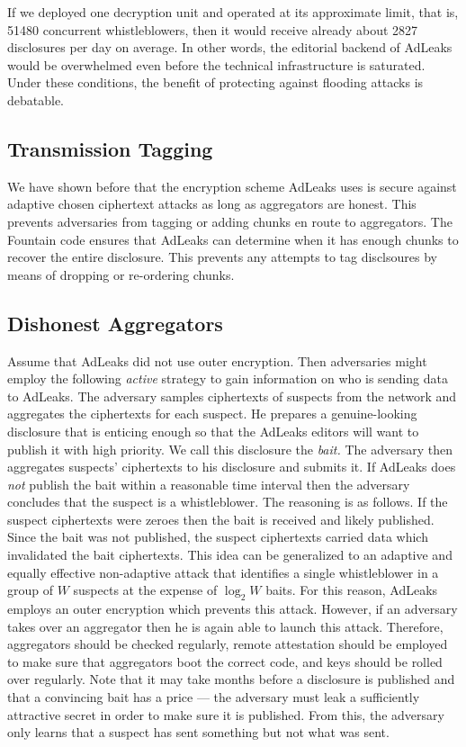 \documentclass[twocolumn,10pt]{article}
\newcommand{\Kmaxwb}{51480}
\newcommand{\Kmaxfiles}{2827}
\begin{document}
If we deployed one decryption unit and operated at its approximate limit,
that is, \Kmaxwb{} concurrent whistleblowers, then it would receive already
about \Kmaxfiles{} disclosures per day on average.  In other words, the
editorial backend of AdLeaks would be overwhelmed even before the technical
infrastructure is saturated.  Under these conditions, the benefit of
protecting against flooding attacks is debatable.


\subsection{Transmission Tagging}
\label{sec:tagging}

We have shown before that the encryption scheme AdLeaks uses is secure
against adaptive chosen ciphertext attacks as long as aggregators are
honest.  This prevents adversaries from tagging or adding chunks en route to
aggregators.  The Fountain code ensures that AdLeaks can determine when it
has enough chunks to recover the entire disclosure.  This prevents any
attempts to tag disclsoures by means of dropping or re-ordering chunks.


\subsection{Dishonest Aggregators}
\label{sec:bait}

Assume that AdLeaks did not use outer encryption.  Then adversaries might
employ the following \emph{active} strategy to gain information on who is
sending data to AdLeaks.  The adversary samples ciphertexts of suspects from
the network and aggregates the ciphertexts for each suspect.  He prepares a
genuine-looking disclosure that is enticing enough so that the AdLeaks
editors will want to publish it with high priority.  We call this disclosure
the \emph{bait.}  The adversary then aggregates suspects' ciphertexts to his
disclosure and submits it.  If AdLeaks does \emph{not} publish the bait
within a reasonable time interval then the adversary concludes that the
suspect is a whistleblower.  The reasoning is as follows.  If the suspect
ciphertexts were zeroes then the bait is received and likely published.
Since the bait was not published, the suspect ciphertexts carried data which
invalidated the bait ciphertexts.  This idea can be generalized to an
adaptive and equally effective non-adaptive attack that identifies a single
whistleblower in a group of $W$ suspects at the expense of $\log_2 W$ baits.
For this reason, AdLeaks employs an outer encryption which prevents this
attack.  However, if an adversary takes over an aggregator then he is again
able to launch this attack.  Therefore, aggregators should be checked
regularly, remote attestation should be employed to make sure that
aggregators boot the correct code, and keys should be rolled over regularly.
Note that it may take months before a disclosure is published and that a
convincing bait has a price --- the adversary must leak a sufficiently
attractive secret in order to make sure it is published.  From this, the
adversary only learns that a suspect has sent something but not what was
sent.
\end{document}
